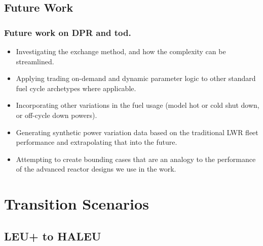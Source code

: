 \documentclass[9pt]{beamer}
\begin{document}
\subsection{Future Work}
\begin{frame}
  \frametitle{Future work on DPR and \gls{tod}.}
  \begin{itemize}[<+->]
    \item Investigating the exchange method, and how the complexity can be streamlined.
    \item Applying trading on-demand and dynamic parameter logic to other standard fuel cycle archetypes where applicable.
    \item Incorporating other variations in the fuel usage (model hot or cold shut down, or off-cycle down powers).
    \item Generating synthetic power variation data based on the traditional LWR fleet performance and extrapolating that into the future.
    \item Attempting to create bounding cases that are an analogy to the performance of the advanced reactor designs we use in the work.
  \end{itemize}
\end{frame}

\section{Transition Scenarios}
  \subsection{LEU+ to HALEU}
\end{document}
